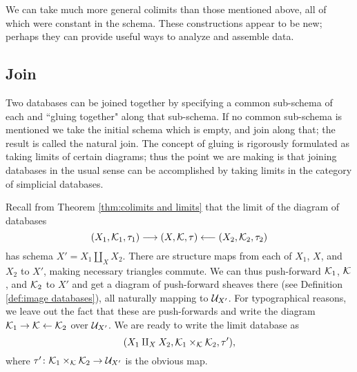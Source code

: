 \documentclass{amsart}
\begin{document}
We can take much more general colimits than those mentioned above, all of which were constant in the schema.  These constructions appear to be new; perhaps they can provide useful ways to analyze and assemble data.

\subsection{Join}\label{subsec:join}

Two databases can be joined together by specifying a common sub-schema of each and ``gluing together" along that sub-schema.  If no common sub-schema is mentioned we take the initial schema which is empty, and join along that; the result is called the natural join.  The concept of gluing is rigorously formulated as taking limits of certain diagrams; thus the point we are making is that joining databases in the usual sense can be accomplished by taking limits in the category of simplicial databases.

Recall from Theorem \ref{thm:colimits and limits} that the limit of the diagram of databases $$(X_1,\mathcal{K}_1,\tau_1)\longrightarrow(X,\mathcal{K},\tau)\longleftarrow(X_2,\mathcal{K}_2,\tau_2)$$ has schema $X'=X_1\amalg_XX_2$.  There are structure maps from each of $X_1$, $X$, and $X_2$ to $X'$, making necessary triangles commute.  We can thus push-forward $\mathcal{K}_1$, $\mathcal{K}$, and $\mathcal{K}_2$ to $X'$ and get a diagram of push-forward sheaves there (see Definition \ref{def:image databases}), all naturally mapping to $\mathcal{U}_{X'}$.  For typographical reasons, we leave out the fact that these are push-forwards and write the diagram $\mathcal{K}_1\rightarrow\mathcal{K}\leftarrow\mathcal{K}_2$ over $\mathcal{U}_{X'}$.  We are ready to write the limit database as $$(X_1\amalg_XX_2,\mathcal{K}_1\times_\mathcal{K}\mathcal{K}_2,\tau'),$$ where $\tau'\colon\mathcal{K}_1\times_\mathcal{K}\mathcal{K}_2\rightarrow\mathcal{U}_{X'}$ is the obvious map.
\end{document}
